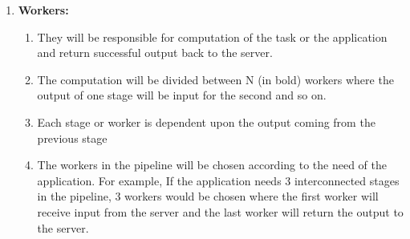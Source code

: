 \begin{enumerate}
{\begin{enumerate}
{				\begin{enumerate}
					\item {
						\textbf{User Facing Process}: This logical side of the server which will take input from the user to run an application over the pipelined workers. It will provide an interface in the form of a terminal window or a custom graphical user interface to the user to run their application.
					}
				
					\item {
						\textbf{Worker Facing Process}: This side of the server will accept input from the user facing side of the server and will be responsible for dividing up the task into stages for the pipeline. Once it divides the tasks, worker nodes are chosen for the pipeline depending upon the number of stages needed for the application. Each stage is given to a worker node. This side also maintains the status of the workers along with communicating with neighboring workers for input, output or running status update.
					}
					
				\end{enumerate}
			}
		
			\item {
				\textbf{Workers:}
				
				\begin{enumerate}
					\item They will be responsible for computation of the task or the application and return successful output back to the server.
					
					\item The computation will be divided between N (in bold) workers where the output of one stage will be input for the second and so on.
					
					\item Each stage or worker is dependent upon the output coming from the previous stage
					
					\item The workers in the pipeline will be chosen according to the need of the application. For example, If the application needs 3 interconnected stages in the pipeline, 3 workers would be chosen where the first worker will receive input from the server and the last worker will return the output to the server.
				\end{enumerate}
			}
		\end{enumerate}
	}
\end{enumerate}